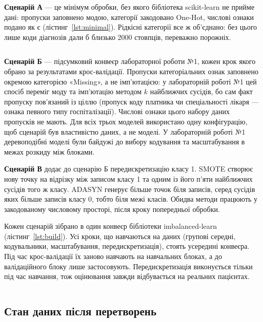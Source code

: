 \documentclass[14pt,a4paper]{extreport}
\begin{document}
\textbf{Сценарій А} --- це мінімум обробки, без якого бібліотека scikit-learn не прийме дані: пропуски заповнено модою, категорії закодовано One-Hot, числові ознаки подано як є (лістинг~\ref{lst:minimal}). Рідкісні категорії все ж об'єднано: без цього лише коди діагнозів дали б близько 2000 стовпців, переважно порожніх.

\inputminted[firstline=92,lastline=111]{python}{../src/mk1/scenarios.py}
\label{lst:minimal}

\textbf{Сценарій Б} --- підсумковий конвеєр лабораторної роботи №1, кожен крок якого обрано за результатами крос-валідації. Пропуски категоріальних ознак заповнено окремою категорією «Missing», а не імп'ютацією: у лабораторній роботі №1 цей спосіб переміг моду та імп'ютацію методом $k$ найближчих сусідів, бо сам факт пропуску пов'язаний із ціллю (пропуск коду платника чи спеціальності лікаря --- ознака певного типу госпіталізації). Числові ознаки цього набору даних пропусків не мають. Для всіх трьох моделей використано одну конфігурацію, щоб сценарій був властивістю даних, а не моделі. У лабораторній роботі №1 деревоподібні моделі були байдужі до вибору кодування та масштабування в межах розкиду між блоками.

\textbf{Сценарій В} додає до сценарію Б передискретизацію класу 1. SMOTE створює нову точку на відрізку між записом класу 1 та одним із його п'яти найближчих сусідів того ж класу. ADASYN генерує більше точок біля записів, серед сусідів яких більше записів класу 0, тобто біля межі класів. Обидва методи працюють у закодованому числовому просторі, після кроку попередньої обробки.

Кожен сценарій зібрано в один конвеєр бібліотеки imbalanced-learn (лістинг~\ref{lst:build}). Усі кроки, що навчаються на даних (групові середні, кодувальники, масштабування, передискретизація), стоять усередині конвеєра. Під час крос-валідації їх заново навчають на навчальних блоках, а до валідаційного блоку лише застосовують. Передискретизація виконується тільки під час навчання, тож оцінювання завжди відбувається на реальних пацієнтах.

\inputminted[firstline=128,lastline=160]{python}{../src/mk1/scenarios.py}
\label{lst:build}

\subsection{Стан даних після перетворень}
\end{document}
